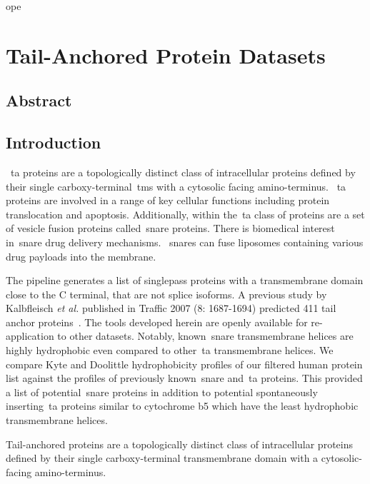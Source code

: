 ope\chapter{Tail-Anchored Protein Datasets}
\sloppy
\section{Abstract}

\section{Introduction}

~\gls{ta} proteins are a topologically distinct class of intracellular proteins defined by their single carboxy-terminal~\gls{tms} with a cytosolic facing amino-terminus.
~\gls{ta} proteins are involved in a range of key cellular functions including protein translocation and apoptosis.
Additionally, within the~\gls{ta} class of proteins are a set of vesicle fusion proteins called~\gls{snare} proteins.
There is biomedical interest in~\gls{snare} drug delivery mechanisms.
~\gls{snare}s can fuse liposomes containing various drug payloads into the membrane.

The pipeline generates a list of singlepass proteins with a transmembrane domain close to the C terminal, that are not splice isoforms.
A previous study by Kalbfleisch \textit{et al.} published in Traffic 2007 (8: 1687-1694) predicted 411 tail anchor proteins~\cite{Kalbfleisch2007}.
The tools developed herein are openly available for re-application to other datasets.
Notably, known~\gls{snare} transmembrane helices are highly hydrophobic even compared to other~\gls{ta} transmembrane helices.
We compare Kyte and Doolittle hydrophobicity profiles of our filtered human protein list against the profiles of previously known~\gls{snare} and~\gls{ta} proteins.
This provided a list of potential~\gls{snare} proteins in addition to potential spontaneously inserting~\gls{ta} proteins similar to cytochrome b5 which have the least hydrophobic transmembrane helices.

Tail-anchored proteins are a topologically distinct class of intracellular proteins defined by their single carboxy-terminal transmembrane domain with a cytosolic-facing amino-terminus.

